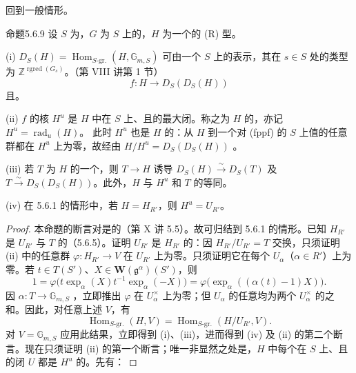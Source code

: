 回到一般情形。
\begin{SGAresult}{命题}{5.6.9}
设 $S$ 为，$G$ 为 $S$ 上的，$H$ 为一个的 (R) 型。

(i) $D_S(H)=\operatorname{Hom}_{S\text{-gr.}}(H,\mathbb G_{m,S})$ 可由一个 $S$ 上的表示，其在 $s\in S$ 处的类型为 $\mathbb Z^{\operatorname{rgred}(G_s)}$。（第 VIII 讲第 1 节）
\[f:H\longrightarrow D_S(D_S(H))\]
且。

(ii) $f$ 的核 $H^u$ 是 $H$ 中在 $S$ 上、且的最大闭。称之为 $H$ 的，亦记 $H^u=\operatorname{rad}_u(H)$。
此时 $H^u$ 也是 $H$ 的：从 $H$ 到一个对 (fppf) 的 $S$ 上值的任意群都在 $H^u$ 上为零，故经由 $H/H^u=D_S(D_S(H))$ 。

(iii) 若 $T$ 为 $H$ 的一个，则 $T\to H$ 诱导 $D_S(H)\xrightarrow\sim D_S(T)$ 及 $T\xrightarrow\sim D_S(D_S(H))$。此外，$H$ 与 $H^u$ 和 $T$ 的等同。

(iv) 在 5.6.1 的情形中，若 $H=H_{R'}$，则 $H^u=U_{R'}$。
\end{SGAresult}
\begin{proof}
本命题的断言对是的（第 X 讲 5.5）。故可归结到 5.6.1 的情形。已知 $H_{R'}$ 是 $U_{R'}$ 与 $T$ 的（5.6.5）。证明 $U_{R'}$ 是 $H_{R'}$ 的：因 $H_{R'}/U_{R'}=T$ 交换，只须证明 (ii) 中的任意群 $\varphi:H_{R'}\to V$ 在 $U_{R'}$ 上为零。只须证明它在每个 $U_\alpha$（$\alpha\in R'$）上为零。若 $t\in T(S')$、$X\in\mathbf W(\mathfrak g^\alpha)(S')$，则
\[1=\varphi\bigl(t\exp_\alpha(X)t^{-1}\exp_\alpha(-X)\bigr)
=\varphi\bigl(\exp_\alpha((\alpha(t)-1)X)\bigr).\]
因 $\alpha:T\to\mathbb G_{m,S}$ ，立即推出 $\varphi$ 在 $U_\alpha^\times$ 上为零；但 $U_\alpha$ 的任意均为两个 $U_\alpha^\times$ 的之和。因此，对任意上述 $V$，有
\[\operatorname{Hom}_{S\text{-gr.}}(H,V)=\operatorname{Hom}_{S\text{-gr.}}(H/U_{R'},V).\]
对 $V=\mathbb G_{m,S}$ 应用此结果，立即得到 (i)、(iii)，进而得到 (iv) 及 (ii) 的第二个断言。现在只须证明 (ii) 的第一个断言；唯一非显然之处是，$H$ 中每个在 $S$ 上、且的闭 $U$ 都是 $H^u$ 的。先有：
\end{proof}
